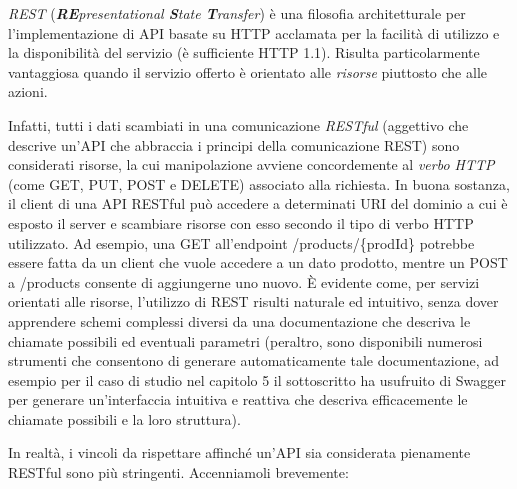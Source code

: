 \emph{REST} (\emph{\textbf{RE}presentational \textbf{S}tate \textbf{T}ransfer}) è una filosofia architetturale per l'implementazione di API basate su HTTP acclamata per la facilità di utilizzo e la disponibilità del servizio (è sufficiente HTTP 1.1). Risulta particolarmente vantaggiosa quando il servizio offerto è orientato alle \emph{risorse} piuttosto che alle azioni.

Infatti, tutti i dati scambiati in una comunicazione \emph{RESTful} (aggettivo che descrive un'API che abbraccia i principi della comunicazione REST) sono considerati risorse, la cui manipolazione avviene concordemente al \emph{verbo HTTP} (come GET, PUT, POST e DELETE) associato alla richiesta.
In buona sostanza, il client di una API RESTful può accedere a determinati URI del dominio a cui è esposto il server e scambiare risorse con esso secondo il tipo di verbo HTTP utilizzato. Ad esempio, una GET all'endpoint /products/\{prodId\} potrebbe essere fatta da un client che vuole accedere a un dato prodotto, mentre un POST a /products consente di aggiungerne uno nuovo. È evidente come, per servizi orientati alle risorse, l'utilizzo di REST risulti naturale ed intuitivo, senza dover apprendere schemi complessi diversi da una documentazione che descriva le chiamate possibili ed eventuali parametri (peraltro, sono disponibili numerosi strumenti che consentono di generare automaticamente tale documentazione, ad esempio per il caso di studio nel capitolo 5 il sottoscritto ha usufruito di Swagger per generare un'interfaccia intuitiva e reattiva che descriva efficacemente le chiamate possibili e la loro struttura).

In realtà, i vincoli da rispettare affinché un'API sia considerata pienamente RESTful sono più stringenti. Accenniamoli brevemente:

